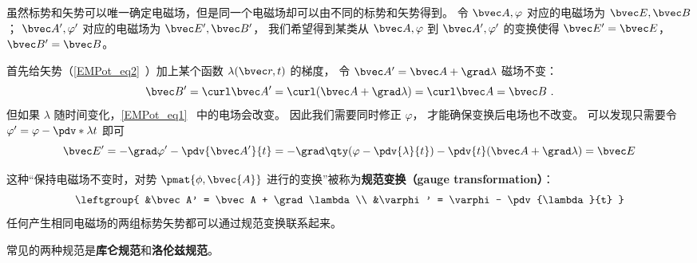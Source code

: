 
\begin{issues}
\issueDraft
\end{issues}


虽然标势和矢势可以唯一确定电磁场，但是同一个电磁场却可以由不同的标势和矢势得到。 令 $\bvec A, \varphi$ 对应的电磁场为 $\bvec E, \bvec B$； $\bvec A', \varphi'$ 对应的电磁场为 $\bvec E', \bvec B'$， 我们希望得到某类从 $\bvec A, \varphi$ 到 $\bvec A', \varphi'$ 的变换使得 $\bvec E' = \bvec E$， $\bvec B' = \bvec B$。

首先给矢势（\autoref{EMPot_eq2}~）加上某个函数 $\lambda(\bvec r, t)$ 的梯度， 令 $\bvec A' = \bvec A + \grad\lambda$ 磁场不变：
\begin{equation}
\bvec B' = \curl \bvec A' = \curl (\bvec A + \grad \lambda) = \curl \bvec A = \bvec B~.
\end{equation}
但如果 $\lambda$ 随时间变化，\autoref{EMPot_eq1}~ 中的电场会改变。 因此我们需要同时修正 $\varphi$， 才能确保变换后电场也不改变。 可以发现只需要令 $\varphi' = \varphi - \pdv*{\lambda}{t}$ 即可
\begin{equation}
\bvec E' = -\grad \varphi' - \pdv{\bvec A'}{t} = -\grad \qty(\varphi - \pdv{\lambda}{t}) - \pdv{t} (\bvec A + \grad \lambda) = \bvec E
\end{equation}


这种“保持电磁场不变时，对势 $\pmat{\phi, \bvec{A}}$ 进行的变换”被称为\textbf{规范变换（gauge transformation）}：
\begin{equation}\label{Gauge_eq3}
\leftgroup{
&\bvec A' = \bvec A + \grad \lambda\\
&\varphi' = \varphi - \pdv{\lambda}{t}
}\end{equation}
任何产生相同电磁场的两组标势矢势都可以通过规范变换联系起来。

常见的两种规范是\textbf{库仑规范}和\textbf{洛伦兹规范}。
